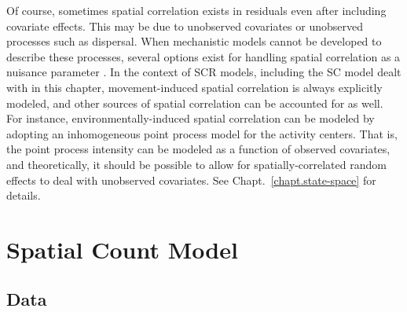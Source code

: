 Of course, sometimes spatial correlation exists in residuals even
after including covariate effects. %
This may be due to
unobserved covariates or unobserved processes such as dispersal. When
mechanistic models cannot be developed to describe these processes,
several options exist for handling spatial correlation as a nuisance
parameter \citep{besag_kooperber:1995,zuur_etal:2009,wikle:2010}. %
In the context of SCR models, including the SC model dealt with in this
chapter, movement-induced spatial correlation is always explicitly
modeled, and other sources of spatial correlation can be accounted for
as well. For instance,
environmentally-induced spatial correlation can be modeled by adopting an
inhomogeneous point process model for the activity centers. That is,
the point process intensity can be modeled as a function of observed
covariates, and theoretically, it should be possible to allow for
spatially-correlated random effects to deal with unobserved covariates.
See Chapt.~\ref{chapt.state-space} for details.




\section{Spatial Count Model}

\subsection{Data}

